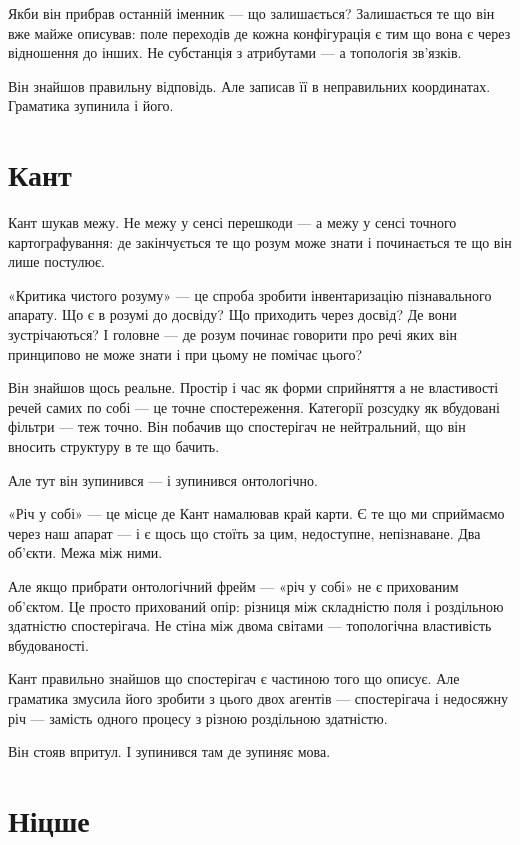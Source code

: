 \documentclass[12pt, a4paper, openany]{book}
\begin{document}
Якби він прибрав останній іменник --- що залишається? Залишається те що він вже майже описував: поле переходів де кожна конфігурація є тим що вона є через відношення до інших. Не субстанція з атрибутами --- а топологія зв'язків.

Він знайшов правильну відповідь. Але записав її в неправильних координатах. Граматика зупинила і його.

\section{Кант}

Кант шукав межу. Не межу у сенсі перешкоди --- а межу у сенсі точного картографування: де закінчується те що розум може знати і починається те що він лише постулює.

«Критика чистого розуму» --- це спроба зробити інвентаризацію пізнавального апарату. Що є в розумі до досвіду? Що приходить через досвід? Де вони зустрічаються? І головне --- де розум починає говорити про речі яких він принципово не може знати і при цьому не помічає цього?

Він знайшов щось реальне. Простір і час як форми сприйняття а не властивості речей самих по собі --- це точне спостереження. Категорії розсудку як вбудовані фільтри --- теж точно. Він побачив що спостерігач не нейтральний, що він вносить структуру в те що бачить.

Але тут він зупинився --- і зупинився онтологічно.

«Річ у собі» --- це місце де Кант намалював край карти. Є те що ми сприймаємо через наш апарат --- і є щось що стоїть за цим, недоступне, непізнаване. Два об'єкти. Межа між ними.

Але якщо прибрати онтологічний фрейм --- «річ у собі» не є прихованим об'єктом. Це просто прихований опір: різниця між складністю поля і роздільною здатністю спостерігача. Не стіна між двома світами --- топологічна властивість вбудованості.

Кант правильно знайшов що спостерігач є частиною того що описує. Але граматика змусила його зробити з цього двох агентів --- спостерігача і недосяжну річ --- замість одного процесу з різною роздільною здатністю.

Він стояв впритул. І зупинився там де зупиняє мова.

\section{Ніцше}
\end{document}
